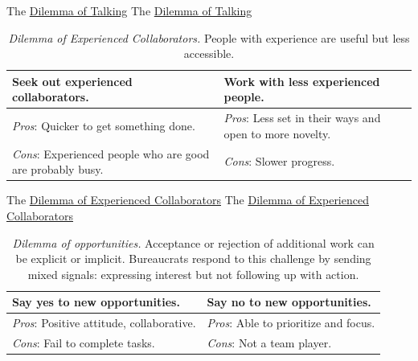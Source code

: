 The \href{table:talk-or-listen}{Dilemma of Talking}
The \href{table:talk-or-listen}{Dilemma of Talking}



\begin{center}
\begin{table}[H] %
\begin{tabular}{ | m{\dilemmatablewidth}| m{\dilemmatablewidth} | } 
  \hline
  \textbf{Seek out experienced collaborators.} & 
  \textbf{Work with less experienced people.} \\ 
  \hline
  \textit{Pros}: Quicker to get something done. &
  \textit{Pros}: Less set in their ways and open to more novelty. \\  
  \hline
  \textit{Cons}: Experienced people who are good are probably busy. &
  \textit{Cons}: Slower progress. \\  
  \hline
\end{tabular}
\caption{
\textit{Dilemma of Experienced Collaborators.}
People with experience are useful but less accessible.
}
\label{table:experience}
\end{table}
\end{center}


The \href{table:experience}{Dilemma of Experienced Collaborators}
The \href{table:experience}{Dilemma of Experienced Collaborators}


\begin{center}
\begin{table}[H] %
\begin{tabular}{ | m{\dilemmatablewidth}| m{\dilemmatablewidth} | } 
  \hline
  \textbf{Say yes to new opportunities.} & 
  \textbf{Say no to new opportunities.} \\ 
  \hline
  \textit{Pros}: Positive attitude, collaborative. &
  \textit{Pros}: Able to prioritize and focus. \\
  \hline
  \textit{Cons}: Fail to complete tasks. &
  \textit{Cons}: Not a team player. \\  
  \hline
\end{tabular}
\caption{
\textit{Dilemma of opportunities.}
Acceptance or rejection of additional work can be explicit or implicit. Bureaucrats respond to this challenge by sending mixed signals: expressing interest but not following up with action.
}
\label{table:new-opportunties}
\end{table}
\end{center}

